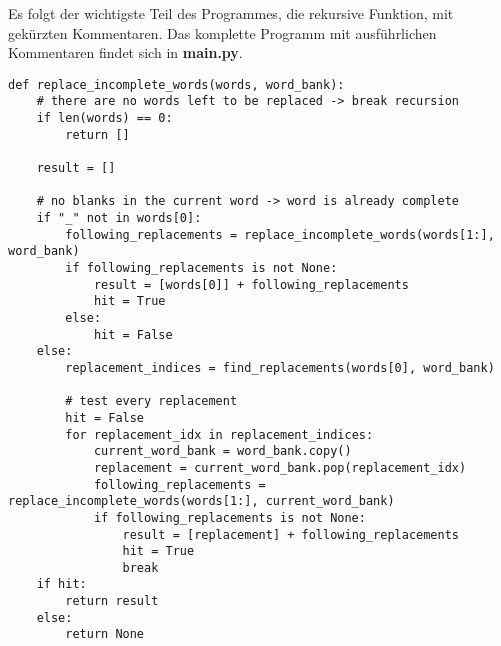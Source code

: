 \documentclass[a4paper,10pt,ngerman]{scrartcl}
\begin{document}
Es folgt der wichtigste Teil des Programmes, die rekursive Funktion, mit gekürzten Kommentaren. Das komplette Programm mit ausführlichen Kommentaren findet sich in \textbf{main.py}.
\begin{lstlisting}
def replace_incomplete_words(words, word_bank):
    # there are no words left to be replaced -> break recursion
    if len(words) == 0:
        return []

    result = []

    # no blanks in the current word -> word is already complete
    if "_" not in words[0]:
        following_replacements = replace_incomplete_words(words[1:], word_bank)
        if following_replacements is not None:
            result = [words[0]] + following_replacements
            hit = True
        else:
            hit = False
    else:
        replacement_indices = find_replacements(words[0], word_bank)

        # test every replacement
        hit = False
        for replacement_idx in replacement_indices:
            current_word_bank = word_bank.copy()
            replacement = current_word_bank.pop(replacement_idx)
            following_replacements = replace_incomplete_words(words[1:], current_word_bank)
            if following_replacements is not None:
                result = [replacement] + following_replacements
                hit = True
                break
    if hit:
        return result
    else:
        return None
\end{lstlisting}
\end{document}
